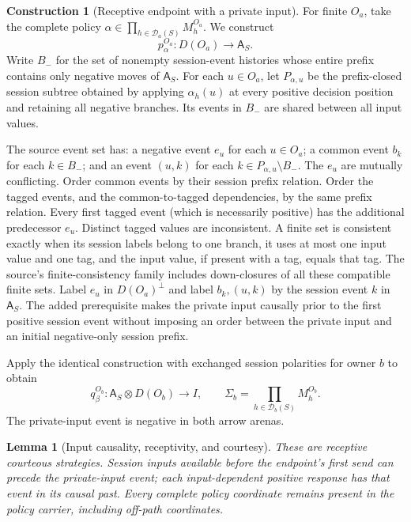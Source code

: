 \documentclass[11pt,a4paper]{article}
\numberwithin{equation}{section}
\newtheorem{lemma}[theorem]{Lemma}
\theoremstyle{definition}
\newtheorem{construction}[construction]{Construction}
\theoremstyle{remark}
\theoremstyle{plain}
\begin{document}
\begin{construction}[Receptive endpoint with a private input]
\label{agt-con-private-endpoint}
For finite $O_a$, take the complete policy
$\alpha\in\prod_{h\in\mathcal D_a(S)}M_h^{O_a}$.  We construct
\[
 p_\alpha^{O_a}:D(O_a)\longrightarrow\mathsf A_S.
\]
Write $B_-$ for the set of nonempty session-event histories whose entire
prefix contains only negative moves of $\mathsf A_S$.  For each
$u\in O_a$, let $P_{\alpha,u}$ be the prefix-closed session subtree
obtained by applying $\alpha_h(u)$ at every positive decision position
and retaining all negative branches.  Its events in $B_-$ are shared
between all input values.

The source event set has: a negative event $e_u$ for each $u\in O_a$;
a common event $b_k$ for each $k\in B_-$; and an event $(u,k)$ for
each $k\in P_{\alpha,u}\setminus B_-$.  The $e_u$ are mutually
conflicting.  Order common events by their session prefix relation.
Order the tagged events, and the common-to-tagged dependencies, by the
same prefix relation.  Every first tagged event (which is necessarily
positive) has the additional predecessor $e_u$.  Distinct tagged values
are inconsistent.  A finite set is consistent exactly when its session
labels belong to one branch, it uses at most one input value and one
tag, and the input value, if present with a tag, equals that tag.
The source's finite-consistency family includes down-closures of all
these compatible finite sets.  Label $e_u$ in $D(O_a)^\perp$ and label
$b_k,(u,k)$ by the session event $k$ in $\mathsf A_S$.
The added prerequisite makes the private input causally prior to the
first positive session event without imposing an order between the
private input and an initial negative-only session prefix.

Apply the identical construction with exchanged session polarities for
owner $b$ to obtain
\[
 q_\beta^{O_b}:\mathsf A_S\otimes D(O_b)\longrightarrow I,
 \qquad\Sigma_b=\prod_{h\in\mathcal D_b(S)}M_h^{O_b}.
\]
The private-input event is negative in both arrow arenas.
\end{construction}

\begin{lemma}[Input causality, receptivity, and courtesy]
\label{agt-lem-private-endpoint}
These are receptive courteous strategies.  Session inputs available
before the endpoint's first send can precede the private-input event;
each input-dependent positive response has that event in its causal
past.  Every complete policy coordinate remains present in the policy
carrier, including off-path coordinates.
\end{lemma}
\end{document}
